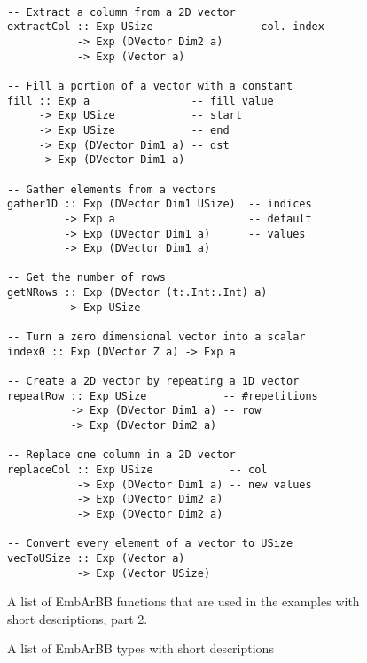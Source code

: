 \begin{figure}
\begin{small}
\begin{Verbatim}

-- Extract a column from a 2D vector
extractCol :: Exp USize              -- col. index
           -> Exp (DVector Dim2 a)  
           -> Exp (Vector a) 
 
-- Fill a portion of a vector with a constant 
fill :: Exp a                -- fill value 
     -> Exp USize            -- start 
     -> Exp USize            -- end 
     -> Exp (DVector Dim1 a) -- dst
     -> Exp (DVector Dim1 a) 

-- Gather elements from a vectors 
gather1D :: Exp (DVector Dim1 USize)  -- indices
         -> Exp a                     -- default
         -> Exp (DVector Dim1 a)      -- values
         -> Exp (DVector Dim1 a) 

-- Get the number of rows 
getNRows :: Exp (DVector (t:.Int:.Int) a) 
         -> Exp USize 

-- Turn a zero dimensional vector into a scalar 
index0 :: Exp (DVector Z a) -> Exp a 

-- Create a 2D vector by repeating a 1D vector
repeatRow :: Exp USize            -- #repetitions
          -> Exp (DVector Dim1 a) -- row
          -> Exp (DVector Dim2 a) 

-- Replace one column in a 2D vector 
replaceCol :: Exp USize            -- col
           -> Exp (DVector Dim1 a) -- new values
           -> Exp (DVector Dim2 a) 
           -> Exp (DVector Dim2 a) 

-- Convert every element of a vector to USize
vecToUSize :: Exp (Vector a) 
           -> Exp (Vector USize)

\end{Verbatim}
\end{small}
\caption{A list of EmbArBB functions that are used in the examples with 
         short descriptions, part 2.} 
\label{fig:listoffun}
\end{figure} 

\begin{figure}
\caption{A list of EmbArBB types with short descriptions} 
\label{fig:listoftyp}
\end{figure} 


